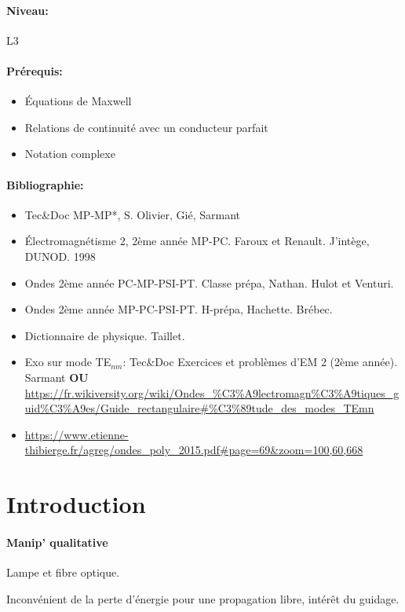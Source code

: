 \documentclass[11pt]{report}
\numberwithin{figure}{section}
\numberwithin{equation}{section}
\numberwithin{table}{section}
\newcommand{\1}{\boldsymbol{1}}
\begin{document}
\paragraph*{Niveau:} L3
\paragraph*{Prérequis:} 
\begin{itemize}
\item Équations de Maxwell
\item Relations de continuité avec un conducteur parfait
\item Notation complexe
\end{itemize}

\paragraph*{Bibliographie:}
\begin{itemize}
\item Tec\&Doc MP-MP*, S. Olivier, Gié, Sarmant
\item Électromagnétisme 2, 2ème année MP-PC. Faroux et Renault. J'intège, DUNOD. 1998
\item Ondes 2ème année PC-MP-PSI-PT. Classe prépa, Nathan. Hulot et Venturi.
\item Ondes 2ème année MP-PC-PSI-PT. H-prépa, Hachette. Brébec.
\item Dictionnaire de physique. Taillet.
\item Exo sur mode TE$_{nm}$: Tec\&Doc Exercices et problèmes d'EM 2 (2ème année). Sarmant \textbf{OU} \url{https://fr.wikiversity.org/wiki/Ondes_%C3%A9lectromagn%C3%A9tiques_guid%C3%A9es/Guide_rectangulaire#%C3%89tude_des_modes_TEmn}
\item \url{https://www.etienne-thibierge.fr/agreg/ondes_poly_2015.pdf#page=69&zoom=100,60,668}
\end{itemize}



\section*{Introduction}
  
\paragraph*{Manip' qualitative} Lampe et fibre optique.


Inconvénient de la perte d'énergie pour une propagation libre, intérêt du guidage.
\end{document}
